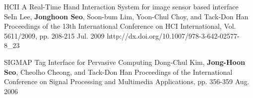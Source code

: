\begin{cventries}
  \cvpublicationentry
    {HCII} %
    {A Real-Time Hand Interaction System for image sensor based interface} %
    {SeIn Lee, \textbf{Jonghoon Seo}, Soon-bum Lim, Yoon-Chul Choy, and Tack-Don Han} %
    {Proceedings of the 13th International Conference on HCI International, Vol. 5611/2009, pp. 208-215}
    {Jul. 2009} %
    {http://dx.doi.org/10.1007/978-3-642-02577-8_23}    %

  \cvpublicationentry
    {SIGMAP} %
    {Tag Interface for Pervasive Computing} %
    {Dong-Chul Kim, \textbf{Jong-Hoon Seo}, Cheolho Cheong, and Tack-Don Han} %
    {Proceedings of the International Conference on Signal Processing and Multimedia Applications, pp. 356-359}
    {Aug. 2006} %
    {}
\end{cventries}



